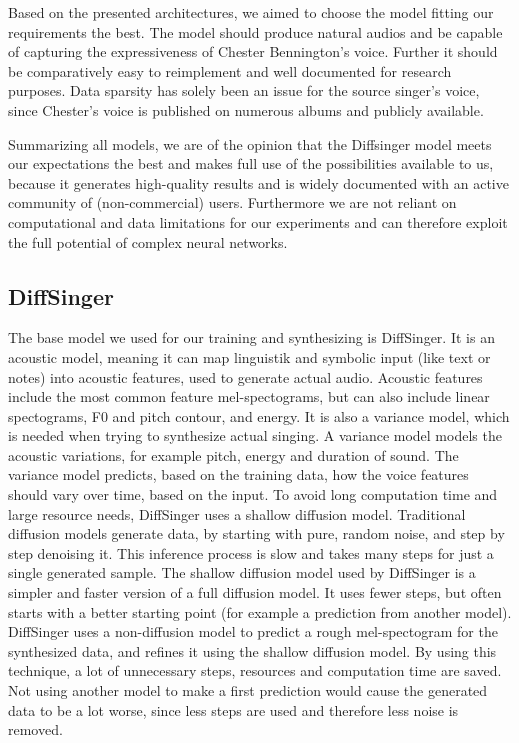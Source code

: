 \documentclass[a4paper]{article}
\begin{document}
	Based on the presented architectures, we aimed to choose the model fitting our requirements the best. The model should produce natural audios and be capable of capturing the expressiveness of Chester Bennington’s voice. Further it should be comparatively easy to reimplement and well documented for research purposes. Data sparsity has solely been an issue for the source singer's voice, since Chester’s voice is published on numerous albums and publicly available. 
	
	Summarizing all models, we are of the opinion that the Diffsinger model meets our expectations the best and makes full use of the possibilities available to us, because it generates high-quality results and is widely documented with an active community of (non-commercial) users. Furthermore we are not reliant on computational and data limitations for our experiments and can therefore exploit the full potential of complex neural networks.
	
	\subsection{DiffSinger}
	The base model we used for our training and synthesizing is DiffSinger. It is an
	acoustic model, meaning it can map linguistik and symbolic input (like text or
	notes) into acoustic features, used to generate actual audio. Acoustic features
	include the most common feature mel-spectograms, but can also include linear
	spectograms, F0 and pitch contour, and energy. It is also a variance model,
	which is needed when trying to synthesize actual singing. A variance model
	models the acoustic variations, for example pitch, energy and duration of sound.
	The variance model predicts, based on the training data, how the voice features
	should vary over time, based on the input. To avoid long computation time and
	large resource needs, DiffSinger uses a shallow diffusion model. Traditional
	diffusion models generate data, by starting with pure, random noise, and step by
	step denoising it. This inference process is slow and takes many steps for just
	a single generated sample. The shallow diffusion model used by DiffSinger is a
	simpler and faster version of a full diffusion model. It uses fewer steps, but
	often starts with a better starting point (for example a prediction from another
	model). DiffSinger uses a non-diffusion model to predict a rough mel-spectogram
	for the synthesized data, and refines it using the shallow diffusion model. By
	using this technique, a lot of unnecessary steps, resources and computation time
	are saved. Not using another model to make a first prediction would cause the
	generated data to be a lot worse, since less steps are used and therefore less
	noise is removed.
	
\end{document}
